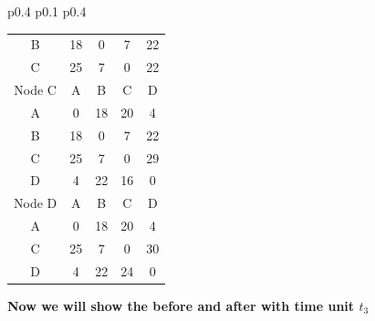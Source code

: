 \documentclass{article}
\begin{document}
\begin{tabular}{p{0.4\linewidth} p{0.1\linewidth} p{0.4\linewidth}}
\begin{tabular}{c|c|c|c|c}
    B & 18 & 0 & 7 & 22 \\
    C & 25 & 7 & 0 & 22 \\
    \hline
    \hline
    Node C & A & B & C & D \\
    \hline
    A & 0 & 18 & 20 & 4 \\
    B & 18 & 0 & 7 & 22 \\
    C & 25 & 7 & 0 & \color{red}29 \\
    D & 4 & 22 & 16 & 0 \\
    \hline
    \hline
    Node D & A & B & C & D \\
    \hline
    A & 0 & 18 & 20 & 4 \\
    C & 25 & 7 & 0 & 30 \\
    D & 4 & 22 & \color{red}24 & 0 \\
    \hline
\end{tabular}
\end{tabular}

\textbf{Now we will show the before and after with time unit $t_3$}\\
\newline
\end{document}
